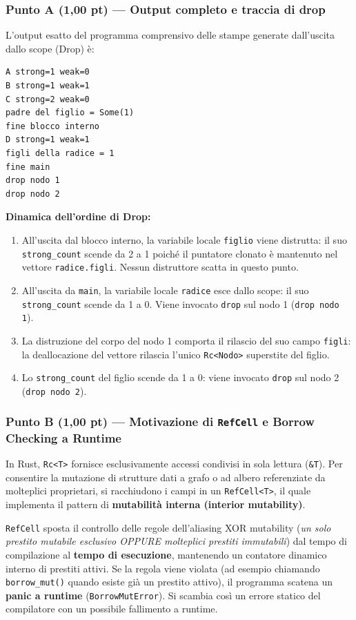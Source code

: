 \documentclass[11pt,a4paper]{article}
\begin{document}
\subsubsection*{Punto A (1,00 pt) --- Output completo e traccia di drop}
L'output esatto del programma comprensivo delle stampe generate dall'uscita dallo scope (Drop) è:
\begin{lstlisting}[style=terminal]
A strong=1 weak=0
B strong=1 weak=1
C strong=2 weak=0
padre del figlio = Some(1)
fine blocco interno
D strong=1 weak=1
figli della radice = 1
fine main
drop nodo 1
drop nodo 2
\end{lstlisting}
\textbf{Dinamica dell'ordine di Drop:}
\begin{enumerate}[leftmargin=1.5em]
    \item All'uscita dal blocco interno, la variabile locale \texttt{figlio} viene distrutta: il suo \texttt{strong\_count} scende da 2 a 1 poiché il puntatore clonato è mantenuto nel vettore \texttt{radice.figli}. Nessun distruttore scatta in questo punto.
    \item All'uscita da \texttt{main}, la variabile locale \texttt{radice} esce dallo scope: il suo \texttt{strong\_count} scende da 1 a 0. Viene invocato \texttt{drop} sul nodo 1 (\texttt{drop nodo 1}).
    \item La distruzione del corpo del nodo 1 comporta il rilascio del suo campo \texttt{figli}: la deallocazione del vettore rilascia l'unico \texttt{Rc<Nodo>} superstite del figlio.
    \item Lo \texttt{strong\_count} del figlio scende da 1 a 0: viene invocato \texttt{drop} sul nodo 2 (\texttt{drop nodo 2}).
\end{enumerate}

\subsubsection*{Punto B (1,00 pt) --- Motivazione di \texttt{RefCell} e Borrow Checking a Runtime}
In Rust, \texttt{Rc<T>} fornisce esclusivamente accessi condivisi in sola lettura (\texttt{\&T}). Per consentire la mutazione di strutture dati a grafo o ad albero referenziate da molteplici proprietari, si racchiudono i campi in un \texttt{RefCell<T>}, il quale implementa il pattern di \textbf{mutabilità interna (interior mutability)}.

\texttt{RefCell} sposta il controllo delle regole dell'aliasing XOR mutability (\emph{un solo prestito mutabile esclusivo OPPURE molteplici prestiti immutabili}) dal tempo di compilazione al \textbf{tempo di esecuzione}, mantenendo un contatore dinamico interno di prestiti attivi.
Se la regola viene violata (ad esempio chiamando \texttt{borrow\_mut()} quando esiste già un prestito attivo), il programma scatena un \textbf{panic a runtime} (\texttt{BorrowMutError}). Si scambia così un errore statico del compilatore con un possibile fallimento a runtime.
\end{document}
